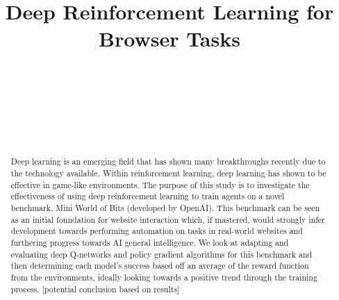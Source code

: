 \documentclass[conference]{IEEEtran}
\begin{document}
%
\title{Deep Reinforcement Learning for Browser Tasks}


\author{
\\
\and
{}
\\
\\
\and
{}
\\
}








\maketitle

\begin{abstract}
Deep learning is an emerging field that has shown many breakthroughs recently due to the technology available. Within reinforcement learning, deep learning has shown to be effective in game-like environments. The purpose of this study is to investigate the effectiveness of using deep reinforcement learning to train agents on a novel benchmark, Mini World of Bits (developed by OpenAI). This benchmark can be seen as an initial foundation for website interaction which, if mastered, would strongly infer development towards performing automation on tasks in real-world websites and furthering progress towards AI general intelligence. We look at adapting and evaluating deep Q-networks and policy gradient algorithms for this benchmark and then determining each model's success based off an average of the reward function from the environments, ideally looking towards a positive trend through the training process. [potential conclusion based on results]
\end{abstract}
\end{document}

